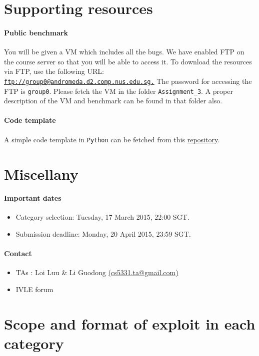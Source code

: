 \documentclass{article}[10pt]
\begin{document}
\section{Supporting resources}
\paragraph{Public benchmark} You will be given a VM which includes all the bugs. We have enabled FTP on 
the course server so that you will be able to access it. To download 
the resources via FTP, use the following URL: 
\href{ftp://group0@andromeda.d2.comp.nus.edu.sg}{\tt ftp://group0@andromeda.d2.comp.nus.edu.sg.}
The password for accessing the FTP is \texttt{group0}. Please fetch the VM in the folder {\tt Assignment\_3}. A proper description of the VM and benchmark can be found in that folder also.

\paragraph{Code template} A simple code template in {\tt Python} can be fetched from this \href{https://github.com/will_udpate_later}{repository}.

\section{Miscellany}
\paragraph{Important dates}
\begin{itemize}
	\item Category selection:  Tuesday, 17 March 2015,  22:00 SGT.
	\item Submission deadline: Monday, 20 April 2015, 23:59 SGT.
\end{itemize}

\paragraph{Contact}
\begin{itemize}
\item TAs : Loi Luu \& Li Guodong \href{mailto:cs5331.ta@gmail.com}{(cs5331.ta@gmail.com)}
\item IVLE forum
\end{itemize}

\section{Scope and format of exploit in each category}
\label{exploit-format}
\end{document}
